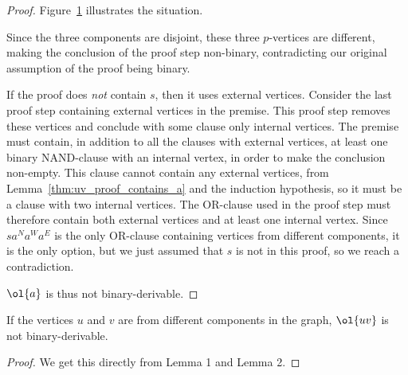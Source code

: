 \begin{proof}
  Figure~\ref{fig:proof_example_uv} illustrates the situation.\par
  \begin{figure}[!h]
    \centering
    \begin{prooftree}
    \end{prooftree}
    \caption{}
    \label{fig:proof_example_uv}
  \end{figure}
  Since the three components are disjoint, these three $p$-vertices are different, making the conclusion of the proof step non-binary, contradicting our original assumption of the proof being binary.

  If the proof does \textit{not} contain $s$, then it uses external vertices.
  Consider the last proof step containing external vertices in the premise.
  This proof step removes these vertices and conclude with some clause only internal vertices.
  The premise must contain, in addition to all the clauses with external vertices, at least one binary NAND-clause with an internal vertex, in order to make the conclusion non-empty.
  This clause cannot contain any external vertices, from Lemma~\ref{thm:uv_proof_contains_a} and the induction hypothesis, so it must be a clause with two internal vertices.
  The OR-clause used in the proof step must therefore contain both external vertices and at least one internal vertex.
  Since $sa^Na^Wa^E$ is the only OR-clause containing vertices from different components, it is the only option, but we just assumed that $s$ is not in this proof, so we reach a contradiction.

  $\ol{a}$ is thus not binary-derivable.
\end{proof}
\begin{corollary}
  If the vertices $u$ and $v$ are from different components in the graph, $\ol{uv}$ is not binary-derivable.
  \label{thm:non_binary_derivable_uv}
\end{corollary}
\begin{proof}
  We get this directly from Lemma 1 and Lemma 2.
\end{proof}

